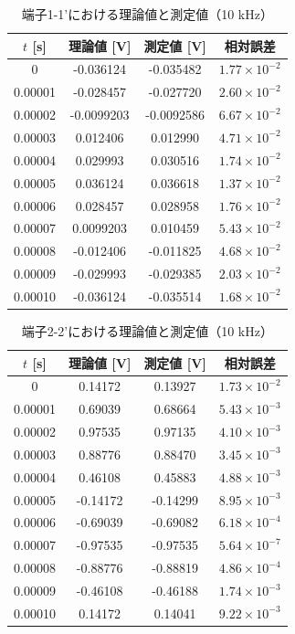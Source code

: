 \documentclass[article]{jlreq}
\begin{document}
\begin{table}[H]
\centering
\caption{端子1-1'における理論値と測定値（10 kHz）}
\begin{tabular}{cccc}
\toprule
$t$ [s] & 理論値 [V] & 測定値 [V] & 相対誤差 \\
\midrule
0        & -0.036124 & -0.035482 & $1.77\times10^{-2}$ \\
0.00001  & -0.028457 & -0.027720 & $2.60\times10^{-2}$ \\
0.00002  & -0.0099203 & -0.0092586 & $6.67\times10^{-2}$ \\
0.00003  & 0.012406 & 0.012990 & $4.71\times10^{-2}$ \\
0.00004  & 0.029993 & 0.030516 & $1.74\times10^{-2}$ \\
0.00005  & 0.036124 & 0.036618 & $1.37\times10^{-2}$ \\
0.00006  & 0.028457 & 0.028958 & $1.76\times10^{-2}$ \\
0.00007  & 0.0099203 & 0.010459 & $5.43\times10^{-2}$ \\
0.00008  & -0.012406 & -0.011825 & $4.68\times10^{-2}$ \\
0.00009  & -0.029993 & -0.029385 & $2.03\times10^{-2}$ \\
0.00010  & -0.036124 & -0.035514 & $1.68\times10^{-2}$ \\
\bottomrule
\end{tabular}
\end{table}

\begin{table}[H]
\centering
\caption{端子2-2'における理論値と測定値（10 kHz）}
\begin{tabular}{cccc}
\toprule
$t$ [s] & 理論値 [V] & 測定値 [V] & 相対誤差 \\
\midrule
0        & 0.14172  & 0.13927  & $1.73\times10^{-2}$ \\
0.00001  & 0.69039  & 0.68664  & $5.43\times10^{-3}$ \\
0.00002  & 0.97535  & 0.97135  & $4.10\times10^{-3}$ \\
0.00003  & 0.88776  & 0.88470  & $3.45\times10^{-3}$ \\
0.00004  & 0.46108  & 0.45883  & $4.88\times10^{-3}$ \\
0.00005  & -0.14172 & -0.14299 & $8.95\times10^{-3}$ \\
0.00006  & -0.69039 & -0.69082 & $6.18\times10^{-4}$ \\
0.00007  & -0.97535 & -0.97535 & $5.64\times10^{-7}$ \\
0.00008  & -0.88776 & -0.88819 & $4.86\times10^{-4}$ \\
0.00009  & -0.46108 & -0.46188 & $1.74\times10^{-3}$ \\
0.00010  & 0.14172  & 0.14041  & $9.22\times10^{-3}$ \\
\bottomrule
\end{tabular}
\end{table}
\end{document}
